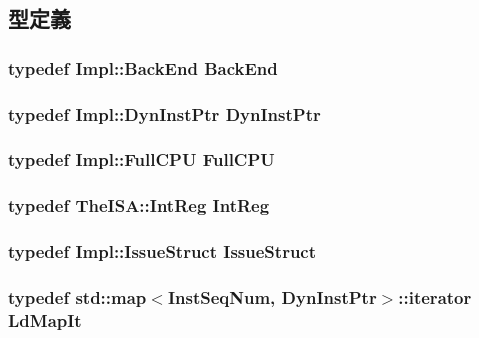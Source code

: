 \subsection{型定義}
\hypertarget{classOzoneLSQ_a3de526baa0cbb2b55bf669a6f7bf81cc}{
\subsubsection[{BackEnd}]{\setlength{\rightskip}{0pt plus 5cm}typedef Impl::BackEnd {\bf BackEnd}}}
\label{classOzoneLSQ_a3de526baa0cbb2b55bf669a6f7bf81cc}
\hypertarget{classOzoneLSQ_a028ce10889c5f6450239d9e9a7347976}{
\subsubsection[{DynInstPtr}]{\setlength{\rightskip}{0pt plus 5cm}typedef Impl::DynInstPtr {\bf DynInstPtr}}}
\label{classOzoneLSQ_a028ce10889c5f6450239d9e9a7347976}
\hypertarget{classOzoneLSQ_a90ba84e54618cc07f2e8f05e046cb5ce}{
\subsubsection[{FullCPU}]{\setlength{\rightskip}{0pt plus 5cm}typedef Impl::FullCPU {\bf FullCPU}}}
\label{classOzoneLSQ_a90ba84e54618cc07f2e8f05e046cb5ce}
\hypertarget{classOzoneLSQ_a1355cb78d031430d4d70eb5080267604}{
\subsubsection[{IntReg}]{\setlength{\rightskip}{0pt plus 5cm}typedef TheISA::IntReg {\bf IntReg}}}
\label{classOzoneLSQ_a1355cb78d031430d4d70eb5080267604}
\hypertarget{classOzoneLSQ_a568c86f6403070f1cb743e994405ba8b}{
\subsubsection[{IssueStruct}]{\setlength{\rightskip}{0pt plus 5cm}typedef Impl::IssueStruct {\bf IssueStruct}}}
\label{classOzoneLSQ_a568c86f6403070f1cb743e994405ba8b}
\hypertarget{classOzoneLSQ_a8b43ca5318a59872c61492868e50bab6}{
\subsubsection[{LdMapIt}]{\setlength{\rightskip}{0pt plus 5cm}typedef std::map$<${\bf InstSeqNum}, {\bf DynInstPtr}$>$::iterator {\bf LdMapIt}}}
